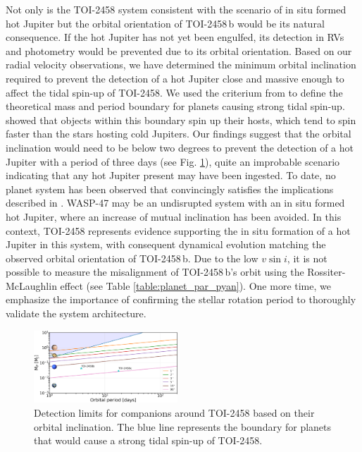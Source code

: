 \documentclass[traditabstract,longauth]{aa}
\begin{document}
Not only is the TOI-2458 system consistent with the scenario of in situ formed hot Jupiter but the orbital orientation of TOI-2458\,b would be its natural consequence. If the hot Jupiter has not yet been engulfed, its detection in RVs and photometry would be prevented due to its orbital orientation. Based on our radial velocity observations, we have determined the minimum orbital inclination required to prevent the detection of a hot Jupiter close and massive enough to affect the tidal spin-up of TOI-2458. We used the criterium from \cite{Tejada21} to define the theoretical mass and period boundary for planets causing strong tidal spin-up. \cite{Tejada21} showed that objects within this boundary spin up their hosts, which tend to spin faster than the stars hosting cold Jupiters. Our findings suggest that the orbital inclination would need to be below two degrees to prevent the detection of a hot Jupiter with a period of three days (see Fig. \ref{fig:limits}), quite an improbable scenario indicating that any hot Jupiter present may have been ingested. To date, no planet system has been observed that convincingly satisfies the implications described in \citet{Batygin16}. WASP-47 may be an undisrupted system with an in situ formed hot Jupiter, where an increase of mutual inclination has been avoided. In this context, TOI-2458 represents evidence supporting the in situ formation of a hot Jupiter in this system, with consequent dynamical evolution matching the observed orbital orientation of TOI-2458\,b. Due to the low $v \sin{i}$, it is not possible to measure the misalignment of TOI-2458\,b's orbit using the Rossiter-McLaughlin effect (see Table \ref{table:planet_par_pyan}). One more time, we emphasize the importance of confirming the stellar rotation period to thoroughly validate the system architecture. 

\begin{figure}
\centering
\includegraphics[width=0.48\textwidth, trim= {0.0cm 0.0cm 0.0cm 0.0cm}]{figures/detec_limits_toi2458.pdf}
\caption{Detection limits for companions around TOI-2458 based on their orbital inclination. The blue line represents the boundary for planets that would cause a strong tidal spin-up of TOI-2458.} \label{fig:limits}
\end{figure}
\end{document}
